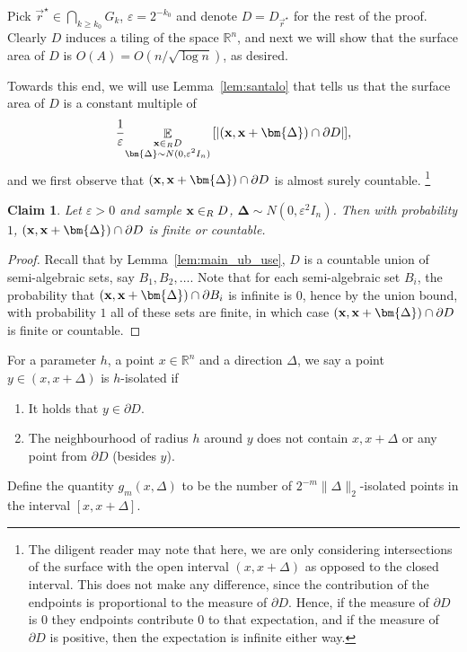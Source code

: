 \documentclass[10pt,a4paper]{article}
\newtheorem{claim}[thm]{Claim}
\newcommand\card[1]{\left| {#1} \right|}
\newcommand\Expect[2]{{\mathop{\mathbb{E}}_{#1}\left[ {#2} \right]}}
\newcommand\norm[1]{\| #1 \|}
\newcommand\eps{\varepsilon}
\renewcommand\geq{\geqslant}
\newcommand{\De}{\Delta}
\begin{document}
    Pick $\vec{r}^{\star}\in \bigcap_{k\geq k_0} G_k$, $\eps = 2^{-k_0}$ and denote $D = D_{\vec{r}^{\star}}$ for the rest of the proof. Clearly $D$ induces a tiling
    of the space $\mathbb{R}^n$, and next we will show that the surface area of $D$ is $O(A) = O(n/\sqrt{\log n})$, as desired.

    Towards this end, we will use Lemma~\ref{lem:santalo} that tells us that the surface
    area of $D$ is a constant multiple of
    \[
    \frac{1}{\eps}\Expect{\substack{{\bf x}\in_R D\\ \bm{\De}\sim N(0,\eps^2 I_n)}}{\card{({\bf x},{\bf x}+\bm{\De})\cap \partial D}},
    \]
    and we first observe that $({\bf x},{\bf x}+\bm{\De})\cap \partial D$ is almost surely countable.
    \footnote{The diligent reader may note that here, we are only considering intersections of the surface with the
    open interval $(x,x+\De)$ as opposed to the closed interval. This does not make any difference,
    since the contribution of the endpoints is proportional to the measure of $\partial D$. Hence, if the measure
    of $\partial D$ is $0$ they endpoints contribute $0$ to that expectation, and if the measure of $\partial D$
    is positive, then the expectation is infinite either way.}

    \begin{claim}\label{claim:countable}
      Let $\eps>0$ and sample ${\bf x}\in_R D$, $\bm{\De}\sim N(0,\eps^2 I_n)$. Then with probability $1$,
      $({\bf x},{\bf x}+\bm{\De})\cap \partial D$ is finite or countable.
    \end{claim}
    \begin{proof}
      Recall that by Lemma~\ref{lem:main_ub_use}, $D$ is a countable union of semi-algebraic sets, say $B_1,B_2,\ldots$.
      Note that for each semi-algebraic set $B_i$, the probability that $({\bf x},{\bf x}+\bm{\De})\cap \partial B_i$ is infinite is $0$, hence
      by the union bound, with probability $1$ all of these sets are finite, in which case $({\bf x},{\bf x}+\bm{\De})\cap \partial D$ is finite
      or countable.
    \end{proof}


    For a parameter $h$, a point $x\in\mathbb{R}^n$ and a direction $\De$, we say a
    point $y\in (x,x+\De)$ is $h$-isolated if
    \begin{enumerate}
      \item It holds that $y\in \partial D$.
      \item The neighbourhood of radius $h$ around $y$ does not contain $x,x+\De$ or any point from $\partial D$ (besides $y$).
    \end{enumerate}
    Define the quantity $g_{m}(x,\De)$ to be the number of $2^{-m}\norm{\Delta}_2$-isolated points in the interval $[x,x+\De]$.
\end{document}
